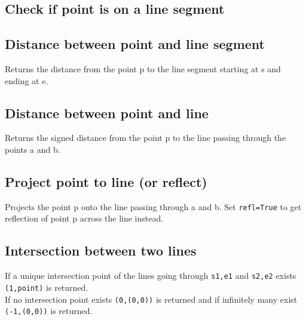 \documentclass{article}
\begin{document}
\subsection*{Check if point is on a line segment}



\subsection*{Distance between point and line segment}
Returns the distance from the point p to the line segment starting at s and ending at e.
\begin{multicols}{2}
  
  \columnbreak
  
\end{multicols}

\pagebreak

\subsection*{Distance between point and line}
Returns the signed distance from the point p to the line passing through the points a and b.
\begin{multicols}{2}
  
  \columnbreak
  
\end{multicols}

\subsection*{Project point to line (or reflect)}
Projects the point p onto the line passing through a and b.
Set \lstinline{refl=True} to get reflection of point p across the line instead.
\begin{multicols}{2}
  
  \columnbreak
  
\end{multicols}

\subsection*{Intersection between two lines}
If a unique intersection point of the lines going through \lstinline{s1,e1} and \lstinline{s2,e2} exists \lstinline{(1,point)} is returned.\\
If no intersection point exists \lstinline{(0,(0,0))} is returned and if infinitely many exist \lstinline{(-1,(0,0))} is returned.
\begin{multicols}{2}
  
  \columnbreak
  
\end{multicols}
\end{document}
